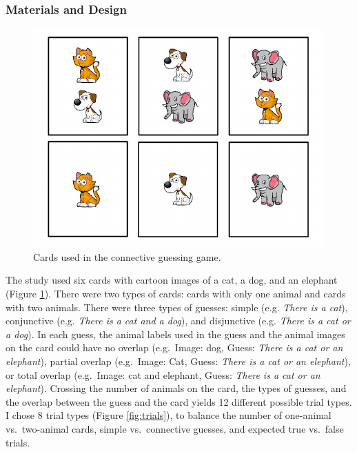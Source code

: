 \documentclass[oneside]{report}
\theoremstyle{definition}
\theoremstyle{definition}
\theoremstyle{definition}
\theoremstyle{remark}
\begin{document}
\subsubsection{Materials and Design}\label{materials-and-design}
\begin{figure}[t]

{\centering \includegraphics{figs/stimuli-1} 

}

\caption{Cards used in the connective guessing game.}\label{fig:stimuli}
\end{figure}
The study used six cards with cartoon images of a cat, a dog, and an
elephant (Figure \ref{fig:stimuli}). There were two types of cards:
cards with only one animal and cards with two animals. There were three
types of guesses: simple (e.g. \emph{There is a cat}), conjunctive (e.g.
\emph{There is a cat and a dog}), and disjunctive (e.g. \emph{There is a
cat or a dog}). In each guess, the animal labels used in the guess and
the animal images on the card could have no overlap (e.g.~Image: dog,
Guess: \emph{There is a cat or an elephant}), partial overlap
(e.g.~Image: Cat, Guess: \emph{There is a cat or an elephant}), or total
overlap (e.g.~Image: cat and elephant, Guess: \emph{There is a cat or an
elephant}). Crossing the number of animals on the card, the types of
guesses, and the overlap between the guess and the card yields 12
different possible trial types. I chose 8 trial types (Figure
\ref{fig:trials}), to balance the number of one-animal vs.~two-animal
cards, simple vs.~connective guesses, and expected true vs.~false
trials.
\end{document}

